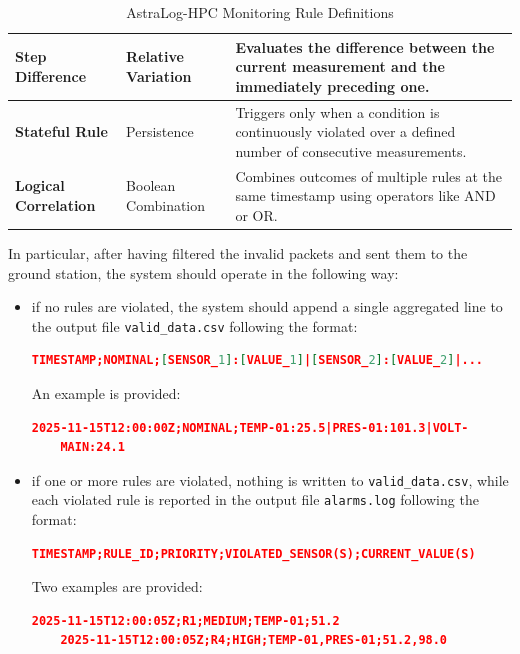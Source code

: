 \documentclass{article}
\begin{document}
\begin{itemize}
\begin{table}[!h]
\begin{tabularx}{\textwidth}{|l|l|X|}
    \textbf{Step Difference} & Relative Variation & Evaluates the difference between the current measurement and the immediately preceding one. \\ \hline
    \textbf{Stateful Rule} & Persistence & Triggers only when a condition is continuously violated over a defined number of consecutive measurements. \\ \hline
    \textbf{Logical Correlation} & Boolean Combination & Combines outcomes of multiple rules at the same timestamp using operators like AND or OR. \\ \hline
    \end{tabularx}
    \caption{AstraLog-HPC Monitoring Rule Definitions}
    \label{tab:monitoring_rules}
    \end{table}
\end{itemize}
In particular, after having filtered the invalid packets and sent them to the ground station, the system should operate in the following way: 
\begin{itemize}
    \item if no rules are violated, the system should append a single aggregated line to the output file \verb|valid_data.csv| following the format: 
\begin{lstlisting}[language = json]
    TIMESTAMP;NOMINAL;[SENSOR_1]:[VALUE_1]|[SENSOR_2]:[VALUE_2]|...
\end{lstlisting}
An example is provided: 
\begin{lstlisting}[language = json]
    2025-11-15T12:00:00Z;NOMINAL;TEMP-01:25.5|PRES-01:101.3|VOLT-
    MAIN:24.1
\end{lstlisting}
    \item if one or more rules are violated, nothing is written to \verb|valid_data.csv|, while each violated rule is reported in the output file \verb|alarms.log| following the format: 
\begin{lstlisting}[language = json]   
    TIMESTAMP;RULE_ID;PRIORITY;VIOLATED_SENSOR(S);CURRENT_VALUE(S)
\end{lstlisting}
Two examples are provided: 
\begin{lstlisting}[language = json]
    2025-11-15T12:00:05Z;R1;MEDIUM;TEMP-01;51.2
    2025-11-15T12:00:05Z;R4;HIGH;TEMP-01,PRES-01;51.2,98.0
\end{lstlisting}
\end{itemize}
\end{document}
